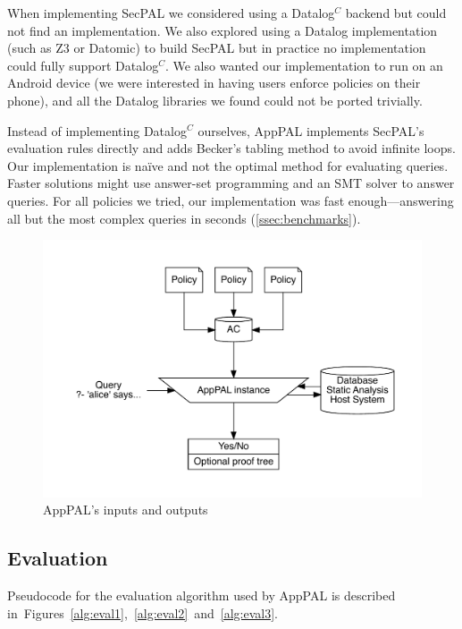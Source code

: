 \documentclass[thesis.tex]{subfiles}
\begin{document}
When implementing SecPAL we considered using a Datalog$^C$ backend but could not
find an implementation. We also explored using a Datalog implementation (such as
Z3 or Datomic) to build SecPAL but in practice no implementation could fully
support Datalog$^C$. We also wanted our implementation to run on an Android
device (we were interested in having users enforce policies on their phone),
and all the Datalog libraries we found could not be ported trivially.

Instead of implementing Datalog$^C$ ourselves, AppPAL implements
SecPAL's evaluation rules directly and adds Becker's tabling
method to avoid infinite loops. Our implementation is na\"ive and not
the optimal method for evaluating queries. Faster solutions might use
answer-set programming and an SMT solver to answer queries. For all
policies we tried, our implementation was fast enough---answering all
but the most complex queries in seconds (\autoref{ssec:benchmarks}).


\begin{figure}
  \centering
  \includegraphics[width=\linewidth]{figures/apppal-evaluation.pdf}
  \caption{AppPAL's inputs and outputs}
  \label{fig:apppal-inputs-outputs}
\end{figure}

\subsection{Evaluation}
\label{ssec:evaluation-alg}

Pseudocode for the evaluation algorithm used by AppPAL is described
in~Figures~\ref{alg:eval1},~\ref{alg:eval2}~and~\ref{alg:eval3}.
\end{document}
